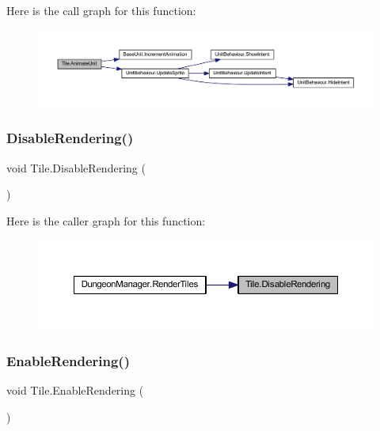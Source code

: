 Here is the call graph for this function\+:
\nopagebreak
\begin{figure}[H]
\begin{center}
\leavevmode
\includegraphics[width=350pt]{class_tile_a87c523416006468a2791d61bf3be54ca_cgraph}
\end{center}
\end{figure}
\mbox{\label{class_tile_abf58797ff0c2df3eddfc9854c3f61dd2}} 
\subsubsection{\texorpdfstring{DisableRendering()}{DisableRendering()}}
{\footnotesize\ttfamily void Tile.\+Disable\+Rendering (\begin{DoxyParamCaption}{ }\end{DoxyParamCaption})}

Here is the caller graph for this function\+:
\nopagebreak
\begin{figure}[H]
\begin{center}
\leavevmode
\includegraphics[width=350pt]{class_tile_abf58797ff0c2df3eddfc9854c3f61dd2_icgraph}
\end{center}
\end{figure}
\mbox{\label{class_tile_a1baa5fe3ab8f887e8985a85fba21210a}} 
\subsubsection{\texorpdfstring{EnableRendering()}{EnableRendering()}}
{\footnotesize\ttfamily void Tile.\+Enable\+Rendering (\begin{DoxyParamCaption}{ }\end{DoxyParamCaption})}


